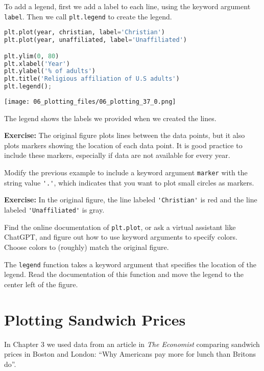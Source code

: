 To add a legend, first we add a label to each line, using the keyword
argument \passthrough{\lstinline!label!}. Then we call
\passthrough{\lstinline!plt.legend!} to create the legend.

\begin{lstlisting}[language=Python,style=source]
plt.plot(year, christian, label='Christian')
plt.plot(year, unaffiliated, label='Unaffiliated')

plt.ylim(0, 80)
plt.xlabel('Year')
plt.ylabel('% of adults')
plt.title('Religious affiliation of U.S adults')
plt.legend();
\end{lstlisting}

\begin{center}
\texttt{[image: 06\_plotting\_files/06\_plotting\_37\_0.png]}
\end{center}

The legend shows the labels we provided when we created the lines.

\textbf{Exercise:} The original figure plots lines between the data
points, but it also plots markers showing the location of each data
point. It is good practice to include these markers, especially if data
are not available for every year.

Modify the previous example to include a keyword argument
\passthrough{\lstinline!marker!} with the string value
\passthrough{\lstinline!'.'!}, which indicates that you want to plot
small circles as markers.

\textbf{Exercise:} In the original figure, the line labeled
\passthrough{\lstinline!'Christian'!} is red and the line labeled
\passthrough{\lstinline!'Unaffiliated'!} is gray.

Find the online documentation of \passthrough{\lstinline!plt.plot!}, or
ask a virtual assistant like ChatGPT, and figure out how to use keyword
arguments to specify colors. Choose colors to (roughly) match the
original figure.

The \passthrough{\lstinline!legend!} function takes a keyword argument
that specifies the location of the legend. Read the documentation of
this function and move the legend to the center left of the figure.

\section{Plotting Sandwich Prices}\label{plotting-sandwich-prices}

In Chapter 3 we used data from an article in \emph{The Economist}
comparing sandwich prices in Boston and London: ``Why Americans pay more
for lunch than Britons do''.

